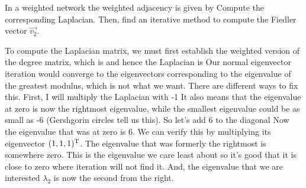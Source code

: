 In a weighted network the weighted adjacency is given by 
Compute the corresponding Laplacian. Then, find an iterative method to compute the Fiedler vector $\vec{v_2}$. 

\solution 
To compute the Laplacian matrix, we must first establish the weighted version of the degree matrix, which is 
and hence the Laplacian is 
Our normal eigenvector iteration would converge to the eigenvectors corresponding to the eigenvalue of the greatest modulus, which is not what we want. There are different ways to fix this. First, I will multiply the Laplacian with -1  
It also means that the eigenvalue at zero is now the rightmost eigenvalue, while the smallest eigenvalue could be as small as -6 (Gershgorin circles tell us this). So let's add 6 to the diagonal 
Now the eigenvalue that was at zero is 6. We can verify this by multiplying its eigenvector $(1,1,1)^{\rm T}$. The eigenvalue that was formerly the rightmost is somewhere zero. This is the eigenvalue we care least about so it's good that it is close to zero where iteration will not find it. And, the eigenvalue that we are interested $\lambda_2$ is now the second from the right.

